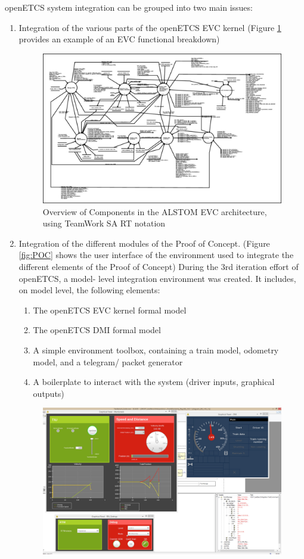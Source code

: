 \documentclass{template/openetcs_article}
\begin{document}
openETCS system integration can be grouped into two main issues:
\begin{enumerate}
 \item Integration of the various parts of the openETCS EVC kernel (Figure \ref{fig:Alstom1} provides an example of an EVC functional breakdown)
\begin{figure}[H]
  \centering
  \includegraphics[width=\textwidth]{images/AlstomDF}
  \caption{Overview of Components in the ALSTOM EVC architecture, using TeamWork SA RT notation}
  \label{fig:Alstom1}
\end{figure}
 \item Integration of the different modules of the Proof of Concept. (Figure \ref{fig:POC} shows the user interface of the environment used to integrate the different elements of the Proof of Concept)
During the 3rd iteration effort of openETCS, a model- level integration environment was created. It includes, on model level, the following elements:
\begin{enumerate}
 \item The openETCS EVC kernel formal model
 \item The openETCS DMI formal model
 \item A simple environment toolbox, containing a train model, odometry model, and a telegram/ packet generator
 \item A boilerplate to interact with the system (driver inputs, graphical outputs)
\end{enumerate}
 \begin{figure}[H]
  \centering
  \includegraphics[width=\textwidth]{images/POC_environment}

\end{figure}
\end{enumerate}
\end{document}
